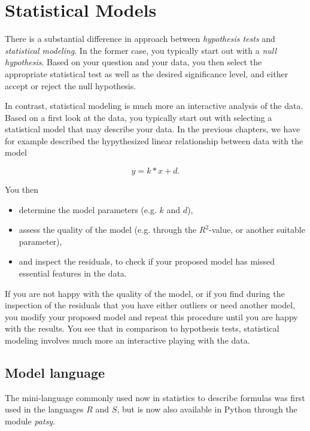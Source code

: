 \chapter{ Statistical Models }\label{chapter:Models}

There is a substantial difference in approach between \emph{hypothesis tests} and \emph{statistical modeling}. In the former case, you typically start out with a \emph{null hypothesis}. Based on your question and your data, you then select the appropriate statistical test as well as the desired significance level, and either accept or reject the null hypothesis.

In contrast, statistical modeling is much more an interactive analysis of the data. Based on a first look at the data, you typically start out with selecting a statistical model that may describe your data. In the previous chapters, we have for example described the hypythesized linear relationship between data with the model

\begin{equation*}
  y = k*x + d .
\end{equation*}

You then
\begin{itemize}
  \item determine the model parameters (e.g. $k$ and $d$),
  \item assess the quality of the model (e.g. through the $R^2$-value, or another suitable parameter),
  \item and inspect the residuals, to check if your proposed model has missed essential features in the data.
\end{itemize}

If you are not happy with the quality of the model, or if you find during the inspection of the residuals that you have either outliers or need another model, you modify your proposed model and repeat this procedure until you are happy with the results. You see that in comparison to hypothesis tests, statistical modeling involves much more an interactive playing with the data.

\section{Model language}
The mini-language commonly used now in statistics to describe formulas was first used in the languages $R$ and $S$, but is now also available in Python through the module \emph{patsy}.

